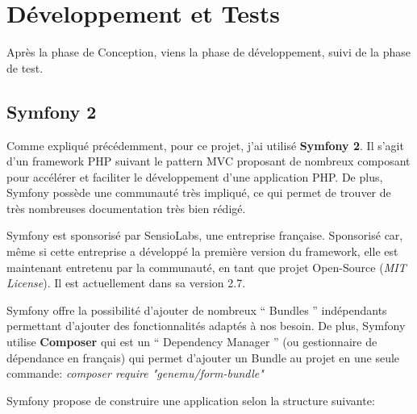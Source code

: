 \section{Développement et Tests}

Après la phase de Conception, viens la phase de développement, suivi de la phase de test.

\subsection{Symfony 2}

Comme expliqué précédemment, pour ce projet, j'ai utilisé \textbf{Symfony 2}. Il s'agit d'un framework PHP suivant le pattern MVC proposant de nombreux composant pour accélérer et faciliter le développement d'une application PHP. De plus, Symfony possède une communauté très impliqué, ce qui permet de trouver de très nombreuses documentation très bien rédigé.

Symfony est sponsorisé par SensioLabs, une entreprise française. Sponsorisé car, même si cette entreprise a développé la première version du framework, elle est maintenant entretenu par la communauté, en tant que projet Open-Source (\textit{MIT License}). Il est actuellement dans sa version 2.7.

Symfony offre la possibilité d'ajouter de nombreux `` Bundles '' indépendants permettant d'ajouter des fonctionnalités adaptés à nos besoin. De plus, Symfony utilise \textbf{Composer} qui est un `` Dependency Manager '' (ou gestionnaire de dépendance en français) qui permet d'ajouter un Bundle au projet en une seule commande: \textit{composer require "genemu/form-bundle"}

Symfony propose de construire une application selon la structure suivante:

